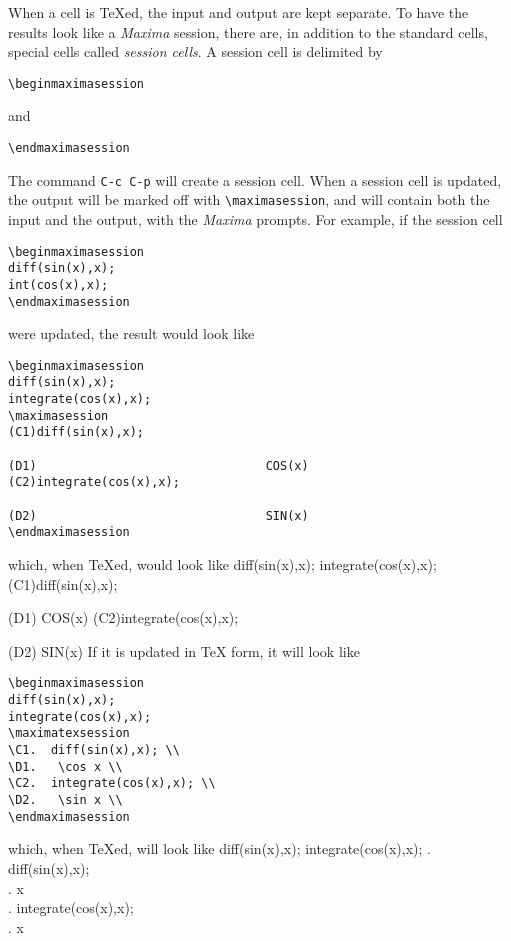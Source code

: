 \documentclass{article}
\newcommand{\mx}{\textsl{\sffamily Maxima}}
\begin{document}
\noindent
When a cell is \TeX{}ed, the input and output are kept separate.  To
have the results look like a \mx{} session, there are, in addition to
the standard cells, special cells called \emph{session cells}.   A
session cell is delimited by
\begin{verbatim}
\beginmaximasession
\end{verbatim}
\noindent
and
\begin{verbatim}
\endmaximasession
\end{verbatim}
\noindent
The command \texttt{C-c C-p} will create a session cell.  When a
session cell is updated, the output will be marked off with
\verb+\maximasession+, and will contain both the input and the output,
with the \mx{} prompts.  For example, if the session cell
\begin{verbatim}
\beginmaximasession
diff(sin(x),x);
int(cos(x),x);
\endmaximasession
\end{verbatim}
\noindent
were updated, the result would look like
\begin{verbatim}
\beginmaximasession
diff(sin(x),x);
integrate(cos(x),x);
\maximasession
(C1)diff(sin(x),x);

(D1)                                COS(x)
(C2)integrate(cos(x),x);

(D2)                                SIN(x)
\endmaximasession
\end{verbatim}
\noindent
which, when \TeX{}ed, would look like
\beginmaximasession
diff(sin(x),x);
integrate(cos(x),x);
\maximasession
(C1)diff(sin(x),x);

(D1)                                COS(x)
(C2)integrate(cos(x),x);

(D2)                                SIN(x)
\endmaximasession
\noindent
If it is updated in \TeX{} form, it will look like
\begin{verbatim}
\beginmaximasession
diff(sin(x),x);
integrate(cos(x),x);
\maximatexsession
\C1.  diff(sin(x),x); \\
\D1.   \cos x \\
\C2.  integrate(cos(x),x); \\
\D2.   \sin x \\
\endmaximasession
\end{verbatim}
\noindent
which, when \TeX{}ed, will look like
\beginmaximasession
diff(sin(x),x);
integrate(cos(x),x);
\maximatexsession
{}.  diff(sin(x),x); \\
.   \cos x \\
.  integrate(cos(x),x); \\
.   \sin x \\
\endmaximasession
\end{document}
